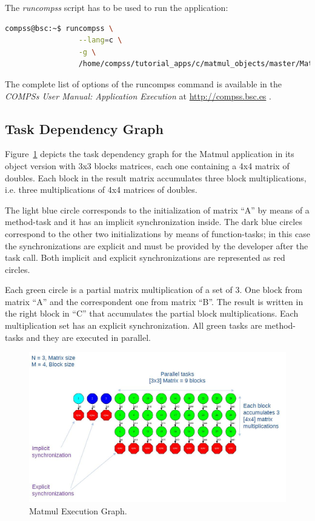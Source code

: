 The \textit{runcompss} script has to be used to run the application:

\begin{lstlisting}[language=bash]
compss@bsc:~$ runcompss \
                 --lang=c \
                 -g \
                 /home/compss/tutorial_apps/c/matmul_objects/master/Matmul 3 4 2.0
\end{lstlisting}

The complete list of options of the runcompss command is available in the \textit{COMPSs User Manual: Application
Execution} at \url{http://compss.bsc.es} . 

\subsection{Task Dependency Graph}
Figure~\ref{fig:matmul_exec_graph} depicts the task dependency graph for the Matmul application in its object version with 3x3 blocks matrices, each one containing a 4x4 matrix of doubles.
Each block in the result matrix accumulates three block multiplications, i.e. three multiplications of 4x4 matrices of doubles.

The light blue circle corresponds to the initialization of matrix ``A'' by means of a method-task and it has 
an implicit synchronization inside. The dark blue circles correspond to the other two initializations by 
means of function-tasks; in this case the synchronizations are explicit and must be provided by the developer after the 
task call. Both implicit and explicit synchronizations are represented as red circles.

Each green circle is a partial matrix multiplication of a set of 3. One block from matrix ``A'' and the 
correspondent one from matrix ``B''. The result is written in the right block in ``C'' that accumulates 
the partial block multiplications. Each multiplication set has an explicit synchronization. 
All green tasks are method-tasks and they are executed in parallel.

\begin{figure}[ht!]
  \centering
    \includegraphics[width=1.0\textwidth]{./Sections/4_C/Figures/matmul.jpeg}
    \caption{Matmul Execution Graph.}
    \label{fig:matmul_exec_graph}
\end{figure}
